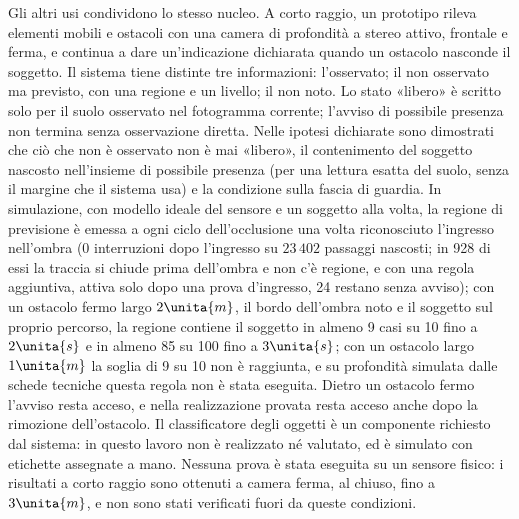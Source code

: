 Gli altri usi condividono lo stesso nucleo. A corto raggio, un prototipo rileva elementi mobili e ostacoli con una camera di profondità a stereo attivo, frontale e ferma, e continua a dare un'indicazione dichiarata quando un ostacolo nasconde il soggetto. Il sistema tiene distinte tre informazioni: l'osservato; il non osservato ma previsto, con una regione e un livello; il non noto. Lo stato «libero» è scritto solo per il suolo osservato nel fotogramma corrente; l'avviso di possibile presenza non termina senza osservazione diretta. Nelle ipotesi dichiarate sono dimostrati che ciò che non è osservato non è mai «libero», il contenimento del soggetto nascosto nell'insieme di possibile presenza (per una lettura esatta del suolo, senza il margine che il sistema usa) e la condizione sulla fascia di guardia. In simulazione, con modello ideale del sensore e un soggetto alla volta, la regione di previsione è emessa a ogni ciclo dell'occlusione una volta riconosciuto l'ingresso nell'ombra (0 interruzioni dopo l'ingresso su $23\,402$ passaggi nascosti; in 928 di essi la traccia si chiude prima dell'ombra e non c'è regione, e con una regola aggiuntiva, attiva solo dopo una prova d'ingresso, 24 restano senza avviso); con un ostacolo fermo largo $2\unita{m}$, il bordo dell'ombra noto e il soggetto sul proprio percorso, la regione contiene il soggetto in almeno 9 casi su 10 fino a $2\unita{s}$ e in almeno 85 su 100 fino a $3\unita{s}$; con un ostacolo largo $1\unita{m}$ la soglia di 9 su 10 non è raggiunta, e su profondità simulata dalle schede tecniche questa regola non è stata eseguita. Dietro un ostacolo fermo l'avviso resta acceso, e nella realizzazione provata resta acceso anche dopo la rimozione dell'ostacolo. Il classificatore degli oggetti è un componente richiesto dal sistema: in questo lavoro non è realizzato né valutato, ed è simulato con etichette assegnate a mano. Nessuna prova è stata eseguita su un sensore fisico: i risultati a corto raggio sono ottenuti a camera ferma, al chiuso, fino a $3\unita{m}$, e non sono stati verificati fuori da queste condizioni.


